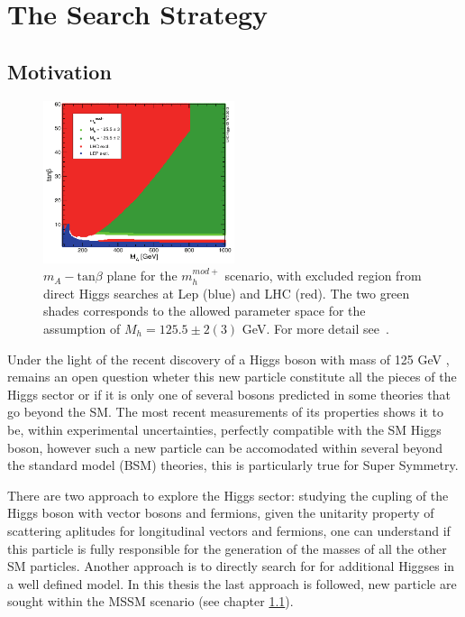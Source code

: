 \section{The Search Strategy}
\label{sec:strategy}

\subsection{Motivation}

\begin{figure}[tp]
     \begin{center}

            \includegraphics[width=0.5\textwidth]{figure/mh_mod.png}

    \end{center}
    \caption{$m_{A} - \text{tan}\beta$ plane for the  $m_{h}^{mod+}$ scenario, with excluded region
	from direct Higgs searches at Lep (blue) and LHC (red). The two green shades corresponds to
	the allowed parameter space for the assumption of $M_{h} = 125.5 \pm 2 (3)$ GeV. For more detail 
	see~\cite{}.}
   \label{fig:mhmod}
\end{figure}

Under the light of the recent discovery of a Higgs 
boson with mass of 125 GeV \cite{}, remains an open question
wheter this new particle constitute all the pieces of the Higgs
sector or if it is only one of several bosons predicted in some theories 
that go beyond the SM. The most recent measurements \cite{} of its
properties shows it to be, within experimental uncertainties, perfectly 
compatible with the SM Higgs boson, however such a new particle can 
be accomodated within several beyond the 
standard model (BSM) theories, this is particularly true for Super Symmetry. 

There are two approach to explore the Higgs sector:
studying the cupling of the Higgs boson with vector
bosons and fermions, given the unitarity property of scattering
aplitudes for longitudinal vectors and fermions, one can understand 
if this particle is  fully responsible for
the generation of the masses of all the other SM particles. 
Another approach is to directly search for %
for additional Higgses in a well defined model. In this thesis the last approach is 
followed, new particle are sought within the MSSM scenario (see chapter \ref{}). 

